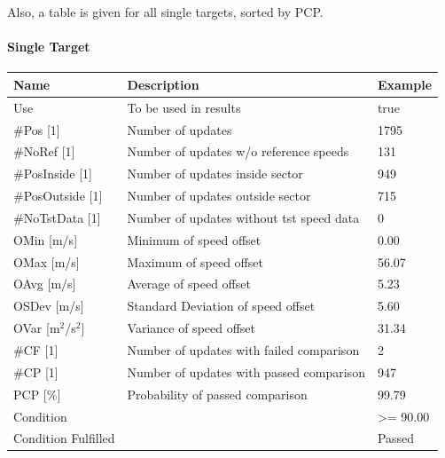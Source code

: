 Also, a table is given for all single targets, sorted by PCP.

\paragraph{Single Target}

\begin{center}
 \begin{table}[H]
  \begin{tabularx}{\textwidth}{ | l | X |  l | }
    \hline
    \textbf{Name} & \textbf{Description} & \textbf{Example} \\ \hline
    Use & To be used in results & true \\ \hline
    \#Pos [1] & Number of updates & 1795 \\ \hline
    \#NoRef [1] & Number of updates w/o reference speeds & 131 \\ \hline
    \#PosInside [1] & Number of updates inside sector & 949 \\ \hline
    \#PosOutside [1] & Number of updates outside sector & 715 \\ \hline
    \#NoTstData [1] & Number of updates without tst speed data & 0 \\ \hline
    OMin [m/s] & Minimum of speed offset & 0.00 \\ \hline
    OMax [m/s] & Maximum of speed offset & 56.07 \\ \hline
    OAvg [m/s] & Average of speed offset & 5.23 \\ \hline
    OSDev [m/s] & Standard Deviation of speed offset & 5.60 \\ \hline
    OVar [m$^2$/s$^2$] & Variance of speed offset & 31.34 \\ \hline
    \#CF [1] & Number of updates with failed comparison & 2 \\ \hline
    \#CP [1] & Number of updates with  passed comparison & 947 \\ \hline
    PCP [\%] & Probability of passed comparison & 99.79 \\ \hline
    Condition &  & >= 90.00 \\ \hline
    Condition Fulfilled &  & Passed \\ \hline
\end{tabularx}
\end{table}
\end{center}
